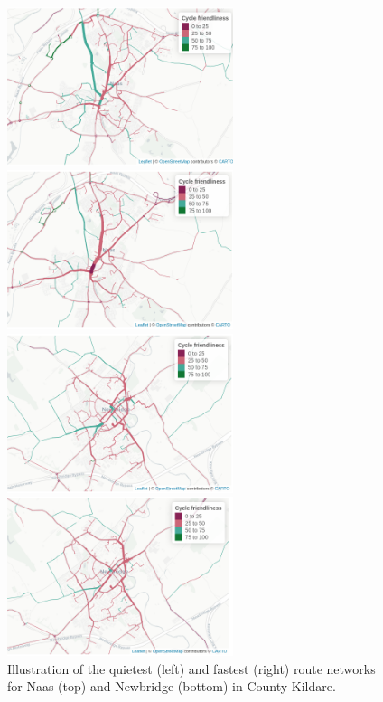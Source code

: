 \documentclass[
  super,
  preprint,
  3p]{elsarticle}
\begin{document}
\begin{figure}

\begin{minipage}{0.50\linewidth}
\includegraphics[width=2.60417in,height=\textheight]{images/naas_quietest_godutch.png}\end{minipage}%
%
\begin{minipage}{0.50\linewidth}
\includegraphics[width=2.60417in,height=\textheight]{images/naas_fastest_godutch.png}\end{minipage}%
\newline
\begin{minipage}{0.50\linewidth}
\includegraphics[width=2.60417in,height=\textheight]{images/newbridge_quietest_godutch.png}\end{minipage}%
%
\begin{minipage}{0.50\linewidth}
\includegraphics[width=2.60417in,height=\textheight]{images/newbridge_fastest_godutch.png}\end{minipage}%

\caption{\label{fig-route-types}Illustration of the quietest (left) and
fastest (right) route networks for Naas (top) and Newbridge (bottom) in
County Kildare.}

\end{figure}%
\end{document}
